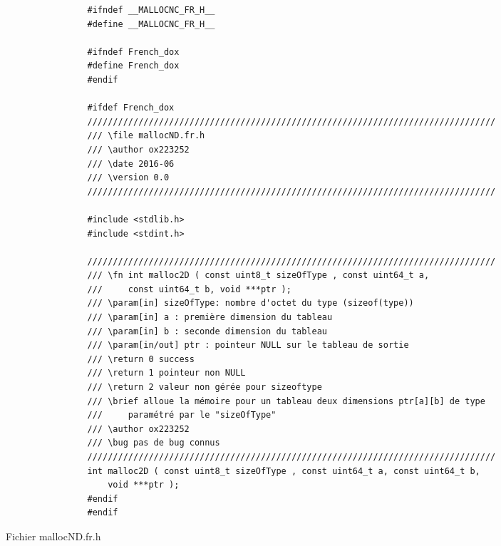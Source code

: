 		\begin{figure}[H]
			\begin{changemargin}{-2.5cm}{-2.5cm}
			\begin{tcolorbox}
			\begin{verbatim}
				#ifndef __MALLOCNC_FR_H__
				#define __MALLOCNC_FR_H__

				#ifndef French_dox
				#define French_dox
				#endif

				#ifdef French_dox
				////////////////////////////////////////////////////////////////////////////////
				/// \file mallocND.fr.h
				/// \author ox223252
				/// \date 2016-06
				/// \version 0.0
				////////////////////////////////////////////////////////////////////////////////

				#include <stdlib.h>
				#include <stdint.h>

				////////////////////////////////////////////////////////////////////////////////
				/// \fn int malloc2D ( const uint8_t sizeOfType , const uint64_t a,
				/// 	const uint64_t b, void ***ptr );
				/// \param[in] sizeOfType: nombre d'octet du type (sizeof(type))
				/// \param[in] a : première dimension du tableau
				/// \param[in] b : seconde dimension du tableau
				/// \param[in/out] ptr : pointeur NULL sur le tableau de sortie
				/// \return 0 success
				/// \return 1 pointeur non NULL
				/// \return 2 valeur non gérée pour sizeoftype
				/// \brief alloue la mémoire pour un tableau deux dimensions ptr[a][b] de type 
				/// 	paramétré par le "sizeOfType"
				/// \author ox223252
				/// \bug pas de bug connus
				////////////////////////////////////////////////////////////////////////////////
				int malloc2D ( const uint8_t sizeOfType , const uint64_t a, const uint64_t b, 
				    void ***ptr );
				#endif
				#endif
			\end{verbatim}
			\end{tcolorbox}
			\end{changemargin}
			\caption{Fichier mallocND.fr.h}
		\end{figure}


